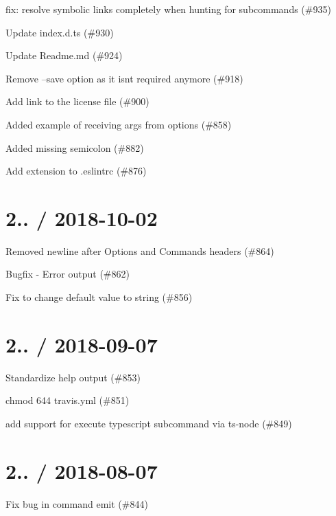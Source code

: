 
\begin{DoxyItemize}
\item fix\+: resolve symbolic links completely when hunting for subcommands (\#935)
\item Update index.\+d.\+ts (\#930)
\item Update Readme.\+md (\#924)
\item Remove --save option as it isn\textquotesingle{}t required anymore (\#918)
\item Add link to the license file (\#900)
\item Added example of receiving args from options (\#858)
\item Added missing semicolon (\#882)
\item Add extension to .eslintrc (\#876)
\end{DoxyItemize}

\section*{2.. / 2018-\/10-\/02 }


\begin{DoxyItemize}
\item Removed newline after Options and Commands headers (\#864)
\item Bugfix -\/ Error output (\#862)
\item Fix to change default value to string (\#856)
\end{DoxyItemize}

\section*{2.. / 2018-\/09-\/07 }


\begin{DoxyItemize}
\item Standardize help output (\#853)
\item chmod 644 travis.\+yml (\#851)
\item add support for execute typescript subcommand via ts-\/node (\#849)
\end{DoxyItemize}

\section*{2.. / 2018-\/08-\/07 }


\begin{DoxyItemize}
\item Fix bug in command emit (\#844)
\end{DoxyItemize}

